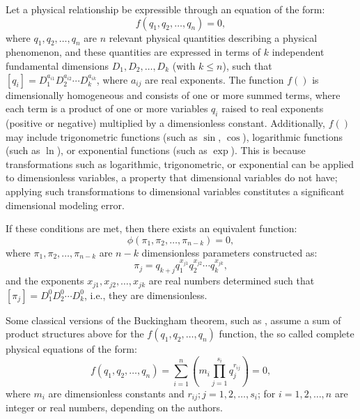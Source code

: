 \documentclass[
	11pt, %
	fleqn, %
	a4paper, %
]{LegrandOrangeBook}
\begin{document}
\begin{theorem}
\label{thm:buckingham}
Let a physical relationship be expressible through an equation of the form:
\begin{equation}
f(q_1,q_2,\ldots,q_n) = 0,
\label{eq:physicalrelation}
\end{equation}
where $q_1,q_2,\ldots,q_n$ are $n$ relevant physical quantities describing a physical phenomenon, and these quantities are expressed in terms of $k$ independent fundamental dimensions $D_1,D_2,\ldots,D_k$ (with $k \leq n$), such that $[q_i] = D_1^{a_{i1}} D_2^{a_{i2}} \cdots D_k^{a_{ik}}$, where $a_{ij}$ are real exponents. The function $f()$ is dimensionally homogeneous and consists of one or more summed terms, where each term is a product of one or more variables $q_i$ raised to real exponents (positive or negative) multiplied by a dimensionless constant. Additionally, $f()$ may include trigonometric functions (such as $\sin$, $\cos$), logarithmic functions (such as $\ln$), or exponential functions (such as $\exp$). This is because transformations such as logarithmic, trigonometric, or exponential can be applied to dimensionless variables, a property that dimensional variables do not have; applying such transformations to dimensional variables constitutes a significant dimensional modeling error.

If these conditions are met, then there exists an equivalent function:
\begin{equation}
\phi(\pi_1,\pi_2,\ldots,\pi_{n-k}) = 0,
\end{equation}
where $\pi_1,\pi_2,\ldots,\pi_{n-k}$ are $n-k$ dimensionless parameters constructed as:
\begin{equation}
\pi_j = q_{k+j}q_1^{x_{j1}}q_2^{x_{j2}}\cdots q_k^{x_{jk}},
\end{equation}
and the exponents $x_{j1}, x_{j2},\ldots, x_{jk}$ are real numbers determined such that $[\pi_j] = D_1^0D_2^0\cdots D_k^0$, i.e., they are dimensionless.
\end{theorem}

Some classical versions of the Buckingham theorem, such as \cite{buckingham1914}, assume a sum of product structures above for the $f(q_1, q_2, \ldots, q_n)$ function, the so called complete physical equations of the form:
\begin{equation}
f(q_1, q_2, \ldots, q_n) = \sum\limits_{i=1}^n \left( m_i \prod\limits_{j=1}^{s_i}q_j^{r_{ij}}\right)=0,
\label{eq:generalphysical}
\end{equation}
where $m_i$ are dimensionless constants and $r_{ij};j=1,2, \ldots, s_i$; for $i=1,2, \ldots, n$ are integer or real numbers, depending on the authors.
\end{document}

